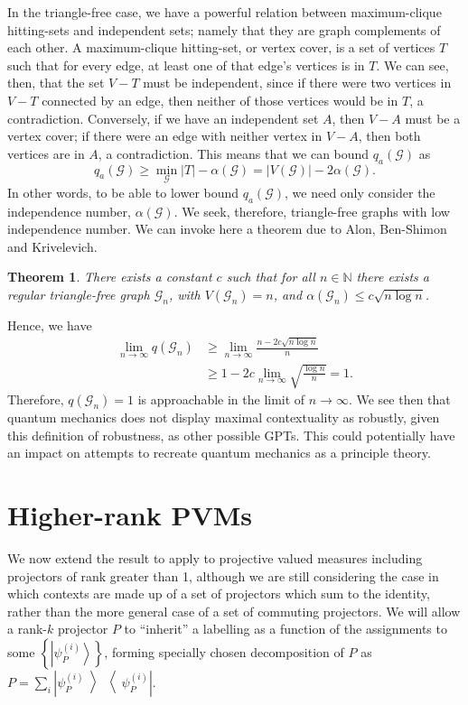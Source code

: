 \documentclass{amsart}
\newtheorem{thm}{Theorem}
\theoremstyle{definition}
\newcommand{\ket}[1]{{\left\vert{#1}\right\rangle}}
\newcommand{\ketbra}[1]{{\left\vert {#1}\middle\rangle\middle\langle{#1}\right\vert}}
\begin{document}
In the triangle-free case, we have a powerful relation between maximum-clique hitting-sets and independent sets; namely that they are graph complements of each other. A maximum-clique hitting-set, or vertex cover, is a set of vertices $T$ such that for every edge, at least one of that edge's vertices is in $T$. We can see, then, that the set $V-T$ must be independent, since if there were two vertices in $V-T$ connected by an edge, then neither of those vertices would be in $T$, a contradiction. Conversely, if we have an independent set $A$, then $V-A$ must be a vertex cover; if there were an edge with neither vertex in $V-A$, then both vertices are in $A$, a contradiction. This means that we can bound $q_a(\mathcal{G})$ as
\begin{equation}
q_a(\mathcal{G})\geq \min_\mathcal{G} |T| - \alpha(\mathcal{G}) = |V(\mathcal{G})|-2\alpha(\mathcal{G}).
\end{equation}
In other words, to be able to lower bound $q_a(\mathcal{G})$, we need only consider the independence number, $\alpha(\mathcal{G})$. We seek, therefore, triangle-free graphs with low independence number. We can invoke here a theorem due to Alon, Ben-Shimon and Krivelevich.\cite{Alon2010}
\begin{thm}
There exists a constant $c$ such that for all $n\in\mathbb{N}$ there exists a regular triangle-free graph $\mathcal{G}_n$, with $V(\mathcal{G}_n)=n$, and $\alpha(\mathcal{G}_n)\leq c\sqrt{n\log n}$.
\end{thm}

Hence, we have
\begin{align}
\lim_{n\rightarrow\infty}q(\mathcal{G}_n)&\geq\lim_{n\rightarrow\infty}\frac{n-2c\sqrt{n\log n}}{n}\\
&\geq 1-2c\lim_{n\rightarrow\infty}\sqrt{\frac{\log n}{n}}=1.
\end{align}
Therefore, $q(\mathcal{G}_n)=1$ is approachable in the limit of $n\rightarrow\infty$. We see then that quantum mechanics does not display maximal contextuality as robustly, given this definition of robustness, as other possible GPTs. This could potentially have an impact on attempts to recreate quantum mechanics as a principle theory.

\FloatBarrier

\section{Higher-rank PVMs}\label{highrank}

We now extend the result to apply to projective valued measures including projectors of rank greater than 1, although we are still considering the case in which contexts are made up of a set of projectors which sum to the identity, rather than the more general case of a set of commuting projectors. We will allow a rank-$k$ projector $P$ to ``inherit'' a labelling as a function of the assignments to some $\left\{\ket{\psi_P^{(i)}}\right\}$, forming specially chosen decomposition of $P$ as $P=\sum_i \ketbra{\psi_P^{(i)}}$.
\end{document}
